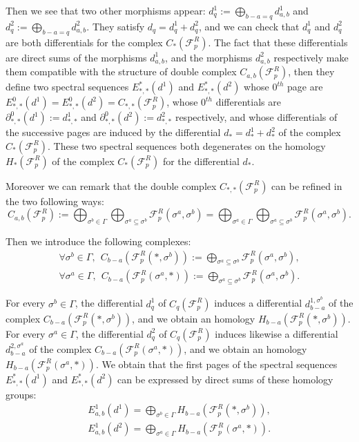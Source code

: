 \documentclass{article}
\begin{document}
Then we see that two other morphisms appear: $d_q^1:= \bigoplus_{b-a=q} d^1_{a,b}$ and $d_q^2:= \bigoplus_{b-a=q} d^2_{a,b}$. They satisfy $d_q=d^1_q+d^2_q$, and we can check that $d^1_q$ and $d^2_q$ are both differentials for the complex $C_*(\mathcal{F}^R_p)$. The fact that these differentials are direct sums of the morphisms $d^1_{a,b}$, and the morphisms $d^2_{a,b}$ respectively make them compatible with the structure of double complex $C_{a,b}(\mathcal{F}^R_p)$, then they define two spectral sequences $E^*_{*,*}(d^1)$ and $E^*_{*,*}(d^2)$ whose $0^{th}$ page are $E^0_{*,*}(d^1)=E^0_{*,*}(d^2)=C_{*,*}(\mathcal{F}^R_p)$, whose $0^{th}$ differentials are $\partial^0_{*,*}(d^1):=d^1_{*,*}$ and $\partial^0_{*,*}(d^2):=d^2_{*,*}$ respectively, and whose differentials of the successive pages are induced by the differential $d_*=d^1_*+d^2_*$ of the complex $C_*(\mathcal{F}^R_p)$. These two spectral sequences both degenerates on the homology $H_*(\mathcal{F}_p^R)$ of the complex $C_*(\mathcal{F}^R_p)$ for the differential $d_*$.

Moreover we can remark that the double complex $C_{*,*}(\mathcal{F}^R_p)$ can be refined in the two following ways:
\begin{equation*}
    C_{a,b}(\mathcal{F}^R_p):= \bigoplus_{\sigma^b \in \Gamma} \bigoplus_{\sigma^a \subseteq \sigma^b} \mathcal{F}_p^R(\sigma^a,\sigma^b) = \bigoplus_{\sigma^a \in \Gamma} \bigoplus_{\sigma^a \subseteq \sigma^b} \mathcal{F}_p^R(\sigma^a,\sigma^b).
\end{equation*}

Then we introduce the following complexes:
\begin{align*}
    \forall \sigma^b \in \Gamma,~~C_{b-a}(\mathcal{F}_p^R(*,\sigma^b)):=\bigoplus_{\sigma^a \subseteq \sigma^b} \mathcal{F}_p^R(\sigma^a,\sigma^b), \\
    \forall \sigma^a \in \Gamma,~~ C_{b-a}(\mathcal{F}_p^R(\sigma^a,*)):=\bigoplus_{\sigma^a \subseteq \sigma^b} \mathcal{F}_p^R(\sigma^a,\sigma^b).
\end{align*}

For every $\sigma^b \in \Gamma$, the differential $d^1_q$ of $C_q(\mathcal{F}^R_p)$ induces a differential $d^{1,\sigma^b}_{b-a}$ of the complex $C_{b-a}(\mathcal{F}_p^R(*,\sigma^b))$, and we obtain an homology $H_{b-a}(\mathcal{F}_p^R(*,\sigma^b))$. For every $\sigma^a \in \Gamma$, the differential $d^2_q$ of $C_q(\mathcal{F}^R_p)$ induces likewise a differential $d^{2,\sigma^a}_{b-a}$ of the complex $C_{b-a}(\mathcal{F}_p^R(\sigma^a,*))$, and we obtain an homology $H_{b-a}(\mathcal{F}_p^R(\sigma^a,*))$. We obtain that the first pages of the spectral sequences $E^*_{*,*}(d^1)$ and $E^*_{*,*}(d^2)$ can be expressed by direct sums of these homology groups:
\begin{align*}
    E^1_{a,b}(d^1)=\bigoplus_{\sigma^b \in \Gamma} H_{b-a}(\mathcal{F}_p^R(*,\sigma^b)), \\
    E^1_{a,b}(d^2)=\bigoplus_{\sigma^a \in \Gamma} H_{b-a}(\mathcal{F}_p^R(\sigma^a,*)).
\end{align*}
\end{document}
